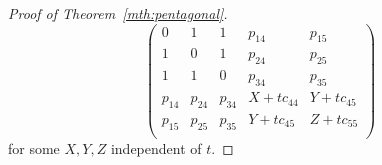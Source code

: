 \documentclass{amsart}
\theoremstyle{definition}
\theoremstyle{remark}
\begin{document}
\begin{proof}[Proof of Theorem~\ref{mth:pentagonal}]
\[%
\begin{pmatrix}
0 & 1 & 1 & p_{14} & p_{15} \\
1 & 0 & 1 & p_{24} & p_{25} \\
1 & 1 & 0 & p_{34} & p_{35} \\
p_{14} & p_{24} & p_{34} & X+tc_{44} & Y+tc_{45} \\
p_{15} & p_{25} & p_{35} & Y+tc_{45} & Z+tc_{55} \\
\end{pmatrix}
\]
for some $X,Y,Z$ independent of $t$. 

\end{proof}
\end{document}
